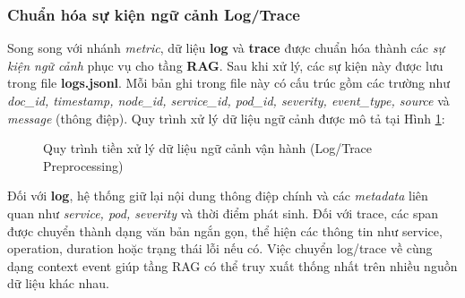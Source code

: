 \subsubsection{Chuẩn hóa sự kiện ngữ cảnh Log/Trace}
Song song với nhánh \textit{metric}, dữ liệu \textbf{log} và \textbf{trace} được chuẩn hóa thành các \textit{sự kiện ngữ cảnh} phục vụ cho tầng \textbf{RAG}. Sau khi xử lý, các sự kiện này được lưu trong file \textbf{logs.jsonl}. Mỗi bản ghi trong file này có cấu trúc gồm các trường như \textit{doc\_id, timestamp, node\_id, service\_id, pod\_id, severity, event\_type, source} và \textit{message} (thông điệp).
Quy trình xử lý dữ liệu ngữ cảnh được mô tả tại Hình \ref{fig:log_trace_preprocessing_flow}:
\begin{figure}[H]
    \centering
    \vspace{0.46cm}
    \caption{Quy trình tiền xử lý dữ liệu ngữ cảnh vận hành (Log/Trace Preprocessing)}
    \label{fig:log_trace_preprocessing_flow}
\end{figure}

Đối với \textbf{log}, hệ thống giữ lại nội dung thông điệp chính và các \textit{metadata} liên quan như \textit{service, pod, severity} và thời điểm phát sinh. Đối với trace, các span được chuyển thành dạng văn bản ngắn gọn, thể hiện các thông tin như service, operation, duration hoặc trạng thái lỗi nếu có. Việc chuyển log/trace về cùng dạng context event giúp tầng RAG có thể truy xuất thống nhất trên nhiều nguồn dữ liệu khác nhau.

